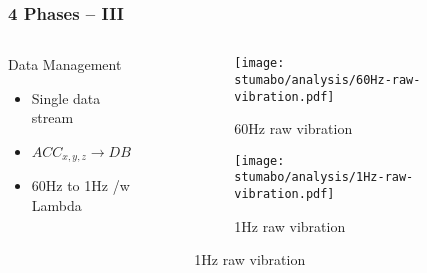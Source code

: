 \begin{frame}
    \frametitle{4 Phases -- III}
    \vspace*{\fill}
    \begin{columns}[onlytextwidth, c]
        \begin{column}{.47\textwidth}
            \begin{exampleblock}{Data Management}
                \begin{itemize}
                    \item Single data stream
                    \item  $ ACC_{x, y, z} \longrightarrow DB$
                    \item 60Hz to 1Hz /w Lambda
                \end{itemize}
            \end{exampleblock}
        \end{column}
        \begin{column}{.52\textwidth}
            \begin{figure}[ht]
                \begin{subfigure}{\textwidth}
                    \centering
                    \texttt{[image: stumabo/analysis/60Hz-raw-vibration.pdf]}
                    \caption{60Hz raw vibration}
                    \label{fig:stu_60Hz_raw}
                \end{subfigure}
                \begin{subfigure}{\textwidth}
                    \centering
                    \texttt{[image: stumabo/analysis/1Hz-raw-vibration.pdf]}
                    \caption{1Hz raw vibration}
                    \label{fig:stu_1Hz_raw}
                \end{subfigure}
            \end{figure}
        \end{column}
    \end{columns}
    \vspace*{\fill}
\end{frame}

